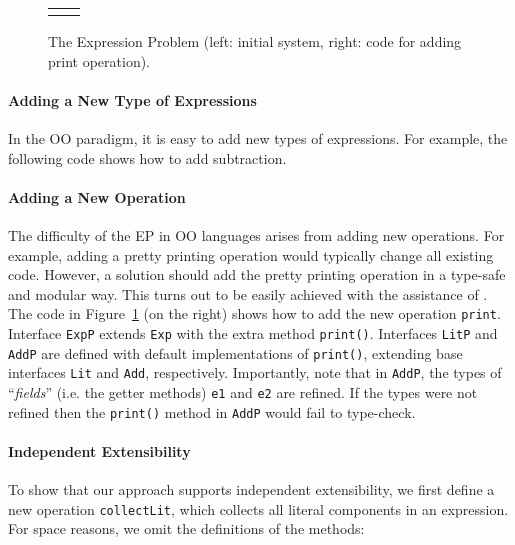 \begin{figure}
\begin{tabular}{l|l}
&
\end{tabular}
\caption{The Expression Problem (left: initial system, right: code for adding
  print operation).}\label{fig:ep}
\end{figure}%

\paragraph{Adding a New Type of Expressions}
In the OO paradigm, it is easy to add new types of expressions. For example, the
following code shows how to add subtraction.


\paragraph{Adding a New Operation} The difficulty of the EP in OO  
languages arises from adding new operations. For example, adding a pretty printing 
operation would typically change all existing code. However, a solution 
should add the pretty printing operation in a type-safe and modular way. This
turns out to be easily achieved with the assistance of \mixin.  The code in
Figure~\ref{fig:ep} (on the right) shows how to add the new operation \texttt{print}.
Interface \texttt{ExpP} extends \texttt{Exp} with the extra method
\texttt{print()}. Interfaces \texttt{LitP} and \texttt{AddP} are defined with
default implementations of \texttt{print()}, extending base interfaces
\texttt{Lit} and \texttt{Add}, respectively. Importantly, note that in
\texttt{AddP}, the types of ``\emph{fields}'' (i.e. the getter methods)
\texttt{e1} and \texttt{e2} are refined. If the types were not refined then
the \texttt{print()} method in \texttt{AddP} would fail to type-check.

\paragraph{Independent Extensibility}
To show that our approach supports independent extensibility, we first define a
new operation \texttt{collectLit}, which collects all
literal components in an expression. For space reasons, 
we omit the definitions of the methods: 

